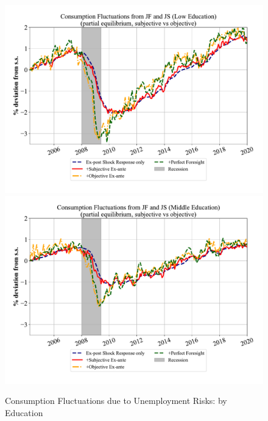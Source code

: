     \begin{figure}
        \centering
          \caption{Consumption Fluctuations due to Unemployment Risks: by Education}
\label{fig:pe_decompose_sub_obj_educ}
\includegraphics[width=0.63\linewidth]{text/chapter2/Figures/consumption_pe_JS_JF_deviation_machine_as_rational_LowEdu_monthly.pdf} \\
\vspace{-2em}
\includegraphics[width=0.63\linewidth]{text/chapter2/Figures/consumption_pe_JS_JF_deviation_machine_as_rational_MidEdu_monthly.pdf}\\


\end{figure}

